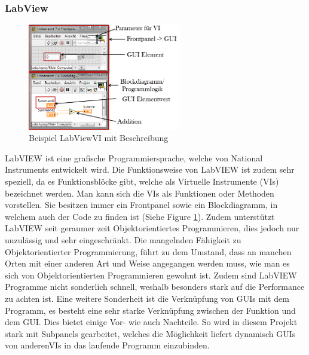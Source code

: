 \documentclass[10pt]{scrartcl}
\begin{document}
\subsubsection{LabView}
\begin{figure}
	\begin{center}
		\includegraphics[width=0.6\textwidth]{LabVIEWExample}
		\caption{Beispiel LabView\gls{VI} mit Beschreibung}
		\label{fig:LabViewExample}
	\end{center}
\end{figure}
\gls{LabVIEW} ist eine grafische Programmiersprache, welche von National Instruments entwickelt wird. Die Funktionsweise von \gls{LabVIEW} ist zudem sehr speziell, da es Funktionsblöcke gibt, welche als Virtuelle Instrumente (\gls{VI}s) bezeichnet werden. Man kann sich die \gls{VI}s als Funktionen oder Methoden vorstellen. Sie besitzen immer ein \gls{Frontpanel} sowie ein \gls{Blockdiagramm}, in welchem auch der Code zu finden ist (Siehe Figure \ref{fig:LabViewExample}). Zudem unterstützt \gls{LabVIEW} seit geraumer zeit Objektorientiertes Programmieren, dies jedoch nur unzulässig und sehr eingeschränkt.
\newline
Die mangelnden Fähigkeit zu Objektorientierter Programmierung, führt zu dem Umstand, dass an manchen Orten mit einer anderen Art und Weise angegangen werden muss, wie man es sich von Objektorientierten Programmieren gewohnt ist. Zudem sind \gls{LabVIEW} Programme nicht sonderlich schnell, weshalb besonders stark auf die Performance zu achten ist.
\newline
Eine weitere Sonderheit ist die Verknüpfung von GUIs mit dem Programm, es besteht eine sehr starke Verknüpfung zwischen der Funktion und dem GUI. Dies bietet einige Vor- wie auch Nachteile. So wird in diesem Projekt stark mit \gls{Subpanel}s gearbeitet, welches die Möglichkeit liefert dynamisch GUIs von anderen\gls{VI}s in das laufende Programm einzubinden.   
\end{document}
